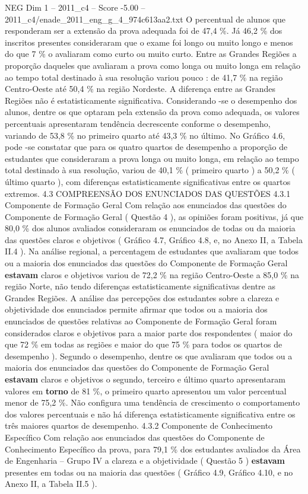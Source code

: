 \begin{textsample}{NEG Dim 1 – 2011\_c4 – Score -5.00 – 2011\_c4/enade\_2011\_eng\_g\_4\_974c613aa2.txt}
O percentual de alunos que responderam ser a extensão da prova adequada foi de 47,4 \%.
Já 46,2 \% dos inscritos presentes consideraram que o exame foi longo ou muito longo e menos do que 7 \% o avaliaram como curto ou muito curto.
Entre as Grandes Regiões a proporção daqueles que avaliaram a prova como longa ou muito longa em relação ao tempo total destinado à sua resolução variou pouco : de 41,7 \% na região Centro-Oeste até 50,4 \% na região Nordeste.
A diferença entre as Grandes Regiões não é estatisticamente significativa.
Considerando -se o desempenho dos alunos, dentre os que optaram pela extensão da prova como adequada, os valores percentuais apresentaram tendência decrescente conforme o desempenho, variando de 53,8 \% no primeiro quarto até 43,3 \% no último.
No Gráfico 4.6, pode -se constatar que para os quatro quartos de desempenho a proporção de estudantes que consideraram a prova longa ou muito longa, em relação ao tempo total destinado à sua resolução, variou de 40,1 \% ( primeiro quarto ) a 50,2 \% ( último quarto ), com diferenças estatisticamente significativas entre os quartos extremos. 4.3 COMPREENSÃO DOS ENUNCIADOS DAS QUESTÕES 4.3.1 Componente de Formação Geral Com relação aos enunciados das questões do Componente de Formação Geral ( Questão 4 ), as opiniões foram positivas, já que 80,0 \% dos alunos avaliados consideraram os enunciados de todas ou da maioria das questões claros e objetivos ( Gráfico 4.7, Gráfico 4.8, e, no Anexo II, a Tabela II.4 ).
Na análise regional, a percentagem de estudantes que avaliaram que todos ou a maioria dos enunciados das questões do Componente de Formação Geral \textbf{estavam} claros e objetivos variou de 72,2 \% na região Centro-Oeste a 85,0 \% na região Norte, não tendo diferenças estatisticamente significativas dentre as Grandes Regiões.
A análise das percepções dos estudantes sobre a clareza e objetividade dos enunciados permite afirmar que todos ou a maioria dos enunciados de questões relativas ao Componente de Formação Geral foram considerados claros e objetivos para a maior parte dos respondentes ( maior do que 72 \% em todas as regiões e maior do que 75 \% para todos os quartos de desempenho ).
Segundo o desempenho, dentre os que avaliaram que todos ou a maioria dos enunciados das questões do Componente de Formação Geral \textbf{estavam} claros e objetivos o segundo, terceiro e último quarto apresentaram valores em \textbf{torno} de 81 \%, o primeiro quarto apresentou um valor percentual menor de 75,2 \%.
Não configura uma tendência de crescimento o comportamento dos valores percentuais e não há diferença estatisticamente significativa entre os três maiores quartos de desempenho. 4.3.2 Componente de Conhecimento Específico Com relação aos enunciados das questões do Componente de Conhecimento Específico da prova, para 79,1 \% dos estudantes avaliados da Área de Engenharia – Grupo IV a clareza e a objetividade ( Questão 5 ) \textbf{estavam} presentes em todas ou na maioria das questões ( Gráfico 4.9, Gráfico 4.10, e no Anexo II, a Tabela II.5 ).

\end{textsample}
